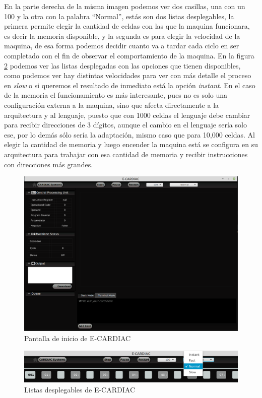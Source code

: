 \documentclass[letterpaper,12pt,oneside]{book}
\begin{document}
	En la
	parte derecha de la misma imagen podemos ver dos casillas, una con un 100 y la otra con la palabra ``Normal'', estás son dos listas desplegables, la primera permite 
	elegir la cantidad de celdas con las que la maquina funcionara, es decir la memoria disponible, y la segunda es para elegir la velocidad de la maquina, de esa
	forma podemos decidir cuanto va a tardar cada ciclo en ser completado con el fin de observar el comportamiento de la maquina. En la figura \ref{fig:listasDespCardiac}
	podemos ver las listas desplegadas con las opciones que tienen disponibles, como podemos ver hay distintas velocidades para ver con más detalle el proceso
	en \textit{slow} o si queremos el resultado de inmediato está la opción \textit{instant}. En el caso de la memoria el funcionamiento es más interesante, pues
	no es solo una configuración externa a la maquina, sino que afecta directamente a la arquitectura y al lenguaje, puesto que con 1000 celdas el lenguaje
	debe cambiar para recibir direcciones de 3 dígitos, aunque el cambio en el lenguaje sería solo ese, por lo demás sólo sería la adaptación, mismo
	caso que para 10,000 celdas. Al elegir la cantidad de memoria y luego encender la maquina está se configura en su arquitectura para trabajar con esa
	cantidad de memoria y recibir instrucciones con direcciones más grandes.

	\begin{figure}[h]
 			\centering
			\includegraphics[scale=0.4]{media/ECARDIAC/ECARDIAC_P1.png}
			\caption{Pantalla de inicio de E-CARDIAC}
			\label{fig:iniECardiac}
	\end{figure}


	\begin{figure}[h]
 			\centering
			\includegraphics[scale=0.45]{media/ECARDIAC/ecardiac_lista_velocidad.png}
			\caption{Listas desplegables de E-CARDIAC}
			\label{fig:listasDespCardiac}
	\end{figure}
\end{document}
